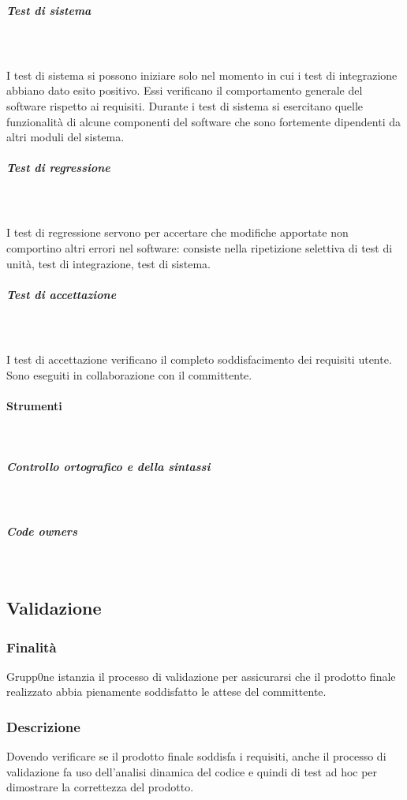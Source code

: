 \documentclass[../norme-di-progetto.tex]{subfiles}
\begin{document}
\subparagraph{Test di sistema}\mbox{}\\
\label{test di sistemaa}
\\ I test di sistema si possono iniziare solo nel momento in cui i test di integrazione abbiano dato esito positivo. Essi verificano il comportamento generale del software rispetto ai requisiti. Durante i test di sistema si esercitano quelle funzionalità di alcune componenti del software che sono fortemente dipendenti da altri moduli del sistema.
\subparagraph{Test di regressione}\mbox{}\\
\label{test di regressione}
\\I test di regressione servono per accertare che modifiche apportate non comportino altri errori nel software: consiste nella ripetizione selettiva di test di unità, test di integrazione, test di sistema.
\subparagraph{Test di accettazione}\mbox{}\\
\label{test di accettazione}
\\I test di accettazione verificano il completo soddisfacimento dei requisiti utente. Sono eseguiti in collaborazione con il committente.
\paragraph{Strumenti}\mbox{}\\
\label{par:strumenti}
\subparagraph{Controllo ortografico e della sintassi}\mbox{}\\
\label{subp:controllo ortografico e della sintassi}
\subparagraph{Code owners}\mbox{}\\
\label{subp:code owners}
\subsection{Validazione}
\label{sub:validazione}
\subsubsection{Finalità}
\label{subs:finalita}
Grupp0ne istanzia il processo di validazione per assicurarsi che il prodotto finale realizzato abbia pienamente soddisfatto le attese del committente.
\subsubsection{Descrizione}
\label{subs:descrizione}
Dovendo verificare se il prodotto finale soddisfa i requisiti, anche il processo di validazione fa uso dell'analisi dinamica del codice e quindi di test ad hoc per dimostrare la correttezza del prodotto.
\end{document}

